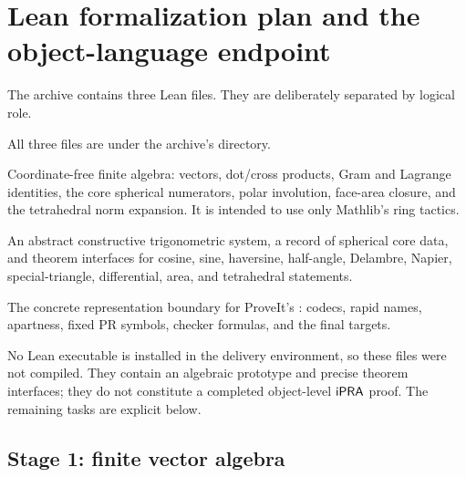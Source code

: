 \section{Lean formalization plan and the object-language endpoint}
\label{sec:formalization}

The archive contains three Lean files.  They are deliberately separated by
logical role.

All three files are under the archive's  directory.
\begin{description}[style=nextline,leftmargin=0pt,labelindent=0pt]
\item[\code{SphericalKernel.lean}]
Coordinate-free finite algebra: vectors, dot/cross products, Gram and Lagrange
identities, the core spherical numerators, polar involution, face-area closure,
and the tetrahedral norm expansion.  It is intended to use only Mathlib's ring
tactics.
\item[\code{SphericalTrig.lean}]
An abstract constructive trigonometric system, a record of spherical core data,
and theorem interfaces for cosine, sine, haversine, half-angle, Delambre,
Napier, special-triangle, differential, area, and tetrahedral statements.
\item[\code{IPRABridge.lean}]
The concrete representation boundary for ProveIt's : codecs,
rapid names, apartness, fixed PR symbols, checker formulas, and the final
 targets.
\end{description}

No Lean executable is installed in the delivery environment, so these files
were not compiled.  They contain an algebraic prototype and precise theorem
interfaces; they do not constitute a completed object-level \(\mathsf{iPRA}\) proof.
The remaining tasks are explicit below.

\subsection{Stage 1: finite vector algebra}

